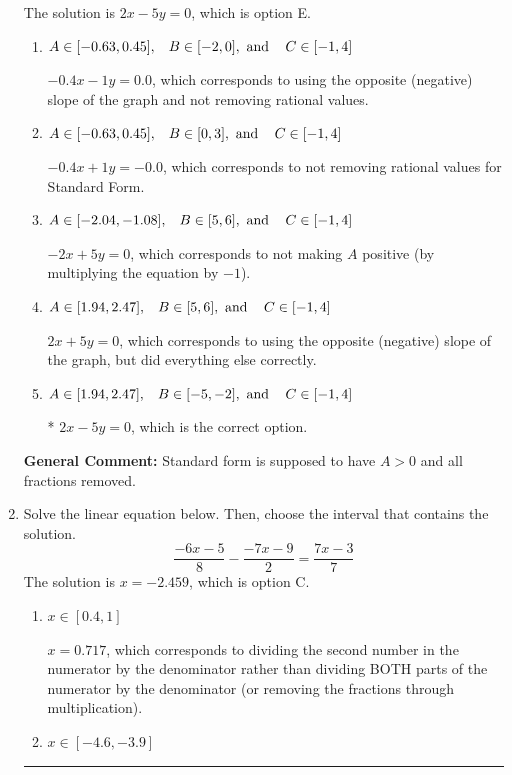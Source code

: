 \documentclass{extbook}[14pt]
\newcommand{\litem}[1]{\item #1

\rule{\textwidth}{0.4pt}}
\begin{document}
\begin{enumerate}
{The solution is \( 2x - 5y = 0 \), which is option E.\begin{enumerate}[label=\Alph*.]
\item \( A \in [-0.63, 0.45], \hspace{3mm} B \in [-2, 0], \text{ and } \hspace{3mm} C \in [-1, 4] \)

 $-0.4x - 1y = 0.0$, which corresponds to using the opposite (negative) slope of the graph and not removing rational values.
\item \( A \in [-0.63, 0.45], \hspace{3mm} B \in [0, 3], \text{ and } \hspace{3mm} C \in [-1, 4] \)

 $-0.4x + 1y = -0.0$, which corresponds to not removing rational values for Standard Form.
\item \( A \in [-2.04, -1.08], \hspace{3mm} B \in [5, 6], \text{ and } \hspace{3mm} C \in [-1, 4] \)

 $-2x + 5y = 0$, which corresponds to not making $A$ positive (by multiplying the equation by $-1$).
\item \( A \in [1.94, 2.47], \hspace{3mm} B \in [5, 6], \text{ and } \hspace{3mm} C \in [-1, 4] \)

 $2x + 5y = 0$, which corresponds to using the opposite (negative) slope of the graph, but did everything else correctly.
\item \( A \in [1.94, 2.47], \hspace{3mm} B \in [-5, -2], \text{ and } \hspace{3mm} C \in [-1, 4] \)

* $2x - 5y = 0$, which is the correct option.
\end{enumerate}

\textbf{General Comment:} Standard form is supposed to have $A > 0$ and all fractions removed.
}
\litem{
Solve the linear equation below. Then, choose the interval that contains the solution.
\[ \frac{-6x -5}{8} - \frac{-7x -9}{2} = \frac{7x -3}{7} \]The solution is \( x = -2.459 \), which is option C.\begin{enumerate}[label=\Alph*.]
\item \( x \in [0.4, 1] \)

 $x = 0.717$, which corresponds to dividing the second number in the numerator by the denominator rather than dividing BOTH parts of the numerator by the denominator (or removing the fractions through multiplication).
\item \( x \in [-4.6, -3.9] \)


\end{enumerate}}
\end{enumerate}
\end{document}
